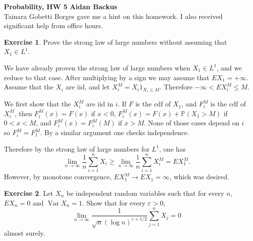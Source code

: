 \documentclass[10pt]{article}
\newcommand{\PP}{\mathbb P}
\newcommand{\Var}{\operatorname{Var}}
\theoremstyle{definition}
\newtheorem{exer}{Exercise}
\begin{document}
\noindent
\large\textbf{Probability, HW 5} \hfill \textbf{Aidan Backus} \\


Tainara Gobetti Borges gave me a hint on this homework.
I also received significant help from office hours.

\begin{exer}
Prove the strong law of large numbers without assuming that $X_1 \in L^1$.
\end{exer}

We have already proven the strong law of large numbers when $X_1 \in L^1$, and we reduce to that case.
After multiplying by a sign we may assume that $EX_1 = +\infty$.
Assume that the $X_i$ are iid, and let $X_i^M = X_i1_{X_i \leq M}$. Therefore $-\infty < EX_i^M \leq M$.

We first show that the $X_i^M$ are iid in $i$.
If $F$ is the cdf of $X_1$, and $F^M_i$ is the cdf of $X_i^M$, then $F_i^M(x) = F(x)$ if $x < 0$, $F_i^M(x) = F(x) + \PP(X_1 > M)$ if $0 < x < M$, and $F_i^M(x) = F_i^M(M)$ if $x > M$.
None of those cases depend on $i$ so $F^M_i = F^M_1$.
By a similar argument one checks independence.

Therefore by the strong law of large numbers for $L^1$, one has
$$\lim_{n \to \infty} \frac{1}{n} \sum_{i=1}^n X_i \geq \lim_{n \to \infty} \frac{1}{n} \sum_{i = 1}^n X_i^M = EX_1^M.$$
However, by monotone convergence, $EX_1^M \to EX_1 = \infty$, which was desired.

\begin{exer}
Let $X_n$ be independent random variables such that for every $n$, $EX_n = 0$ and $\Var X_n = 1$. Show that for every $\varepsilon > 0$,
$$\lim_{n \to \infty} \frac{1}{\sqrt n (\log n)^{\varepsilon + 1/2}} \sum_{j=1}^n X_j = 0$$
almost surely.
\end{exer}
\end{document}
